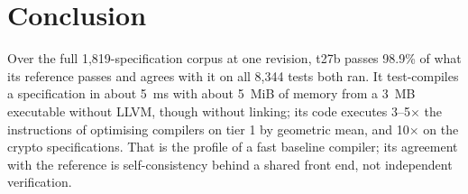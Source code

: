 \documentclass[11pt,a4paper]{article}
\begin{document}
\section{Conclusion}

Over the full 1,819-specification corpus at one revision, t27b passes
98.9\% of what its reference passes and agrees with it on all 8,344 tests
both ran. It test-compiles a specification in about 5~ms with about
5~MiB of memory from a 3~MB executable without LLVM, though without
linking; its code executes 3--5$\times$ the instructions of optimising
compilers on tier 1 by geometric mean, and 10$\times$ on the crypto
specifications. That is the profile
of a fast baseline compiler; its agreement with the reference is
self-consistency behind a shared front end, not independent verification.

\raggedright
\end{document}
